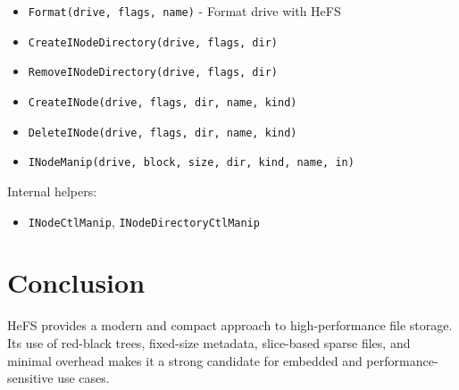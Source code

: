 \documentclass{article}
\begin{document}
\begin{itemize}
  \item \texttt{Format(drive, flags, name)} - Format drive with HeFS
  \item \texttt{CreateINodeDirectory(drive, flags, dir)}
  \item \texttt{RemoveINodeDirectory(drive, flags, dir)}
  \item \texttt{CreateINode(drive, flags, dir, name, kind)}
  \item \texttt{DeleteINode(drive, flags, dir, name, kind)}
  \item \texttt{INodeManip(drive, block, size, dir, kind, name, in)}
\end{itemize}

Internal helpers:
\begin{itemize}
  \item \texttt{INodeCtlManip}, \texttt{INodeDirectoryCtlManip}
\end{itemize}

\section{Conclusion}
HeFS provides a modern and compact approach to high-performance file storage.
Its use of red-black trees, fixed-size metadata, slice-based sparse files, and minimal overhead makes it a strong candidate for embedded and performance-sensitive use cases.
\end{document}

